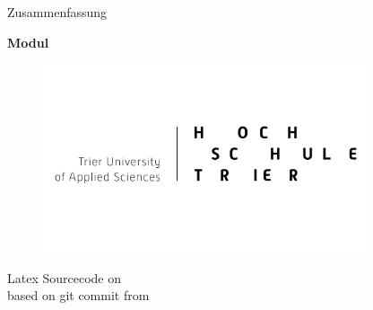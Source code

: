 \begin{titlepage}
  \begin{center}
    \begin{large}
      Zusammenfassung
    \end{large}
    
    \begin{huge}
      \begin{singlespace}
            \textbf{Modul}
      \end{singlespace}
    \end{huge}

    \vspace{0.5cm}

    \begin{figure}[h]
      \centering
      \includegraphics[width=0.85\textwidth]{images//logo.png}
      \label{img:fh-trier-logo}
    \end{figure}

    \vspace{2cm}
    
    Latex Sourcecode on  \\
    based on git commit  from 
    
    
  \end{center}
\end{titlepage}
